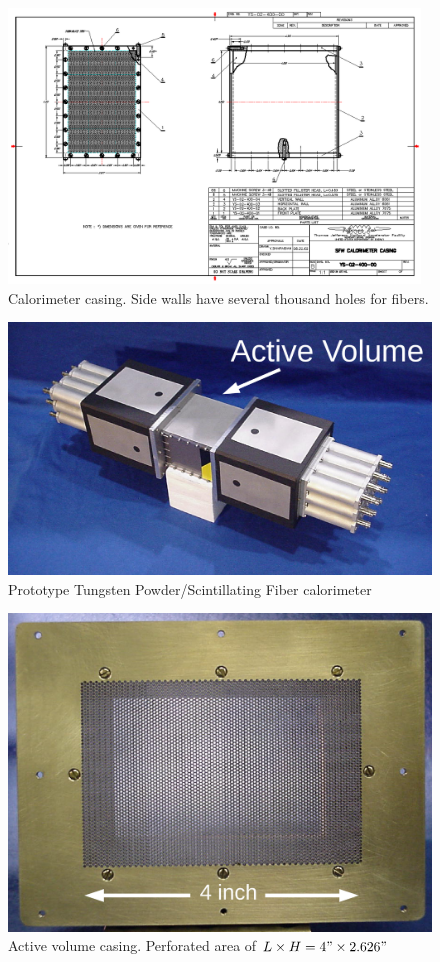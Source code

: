 \begin{figure}[h]
\centering
\includegraphics[width=0.975\textwidth]{images/Fig1_CalorimeterCasing.png}
\caption{Calorimeter casing. Side walls have several thousand holes for fibers.}
\label{fig:CalorimeterCasing}
\end{figure}

\begin{figure}[h]
\centering
\includegraphics[width=0.9\linewidth]{images/Fig2_Prototype_Text.png}
\caption{Prototype Tungsten Powder/Scintillating Fiber calorimeter}
\label{fig:Prototype}
\end{figure}

\begin{figure}[h]
\centering
\includegraphics[width=0.9\linewidth]{images/Fig3_ActiveVolumeCasing_Text.png}
\caption{Active volume casing. Perforated area of $L \times H = 4" \times 2.626"$}
\label{fig:ActiveVolumeCasing}
\end{figure}

